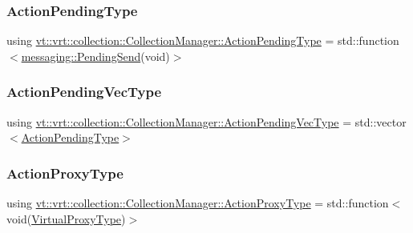 \subsubsection{\texorpdfstring{Action\+Pending\+Type}{ActionPendingType}}
{\footnotesize\ttfamily using \hyperlink{structvt_1_1vrt_1_1collection_1_1_collection_manager_a61252b0d805cdb8fdea35439de468001}{vt\+::vrt\+::collection\+::\+Collection\+Manager\+::\+Action\+Pending\+Type} =  std\+::function$<$\hyperlink{structvt_1_1messaging_1_1_pending_send}{messaging\+::\+Pending\+Send}(void)$>$\hspace{0.3cm}{\ttfamily [private]}}

\mbox{\label{structvt_1_1vrt_1_1collection_1_1_collection_manager_a3e6c49166f298e9aada17c9dcaa080dd}} 
\subsubsection{\texorpdfstring{Action\+Pending\+Vec\+Type}{ActionPendingVecType}}
{\footnotesize\ttfamily using \hyperlink{structvt_1_1vrt_1_1collection_1_1_collection_manager_a3e6c49166f298e9aada17c9dcaa080dd}{vt\+::vrt\+::collection\+::\+Collection\+Manager\+::\+Action\+Pending\+Vec\+Type} =  std\+::vector$<$\hyperlink{structvt_1_1vrt_1_1collection_1_1_collection_manager_a61252b0d805cdb8fdea35439de468001}{Action\+Pending\+Type}$>$\hspace{0.3cm}{\ttfamily [private]}}

\mbox{\label{structvt_1_1vrt_1_1collection_1_1_collection_manager_a98a759caf144277dcd341cdbd5538f59}} 
\subsubsection{\texorpdfstring{Action\+Proxy\+Type}{ActionProxyType}}
{\footnotesize\ttfamily using \hyperlink{structvt_1_1vrt_1_1collection_1_1_collection_manager_a98a759caf144277dcd341cdbd5538f59}{vt\+::vrt\+::collection\+::\+Collection\+Manager\+::\+Action\+Proxy\+Type} =  std\+::function$<$void(\hyperlink{namespacevt_a1b417dd5d684f045bb58a0ede70045ac}{Virtual\+Proxy\+Type})$>$}

